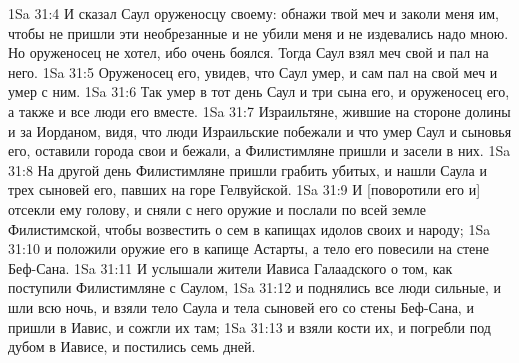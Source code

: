 \vs 1Sa 31:4 И сказал Саул оруженосцу своему: обнажи твой меч и заколи меня им, чтобы не пришли эти необрезанные и не убили меня и не издевались надо мною. Но оруженосец не хотел, ибо очень боялся. Тогда Саул взял меч свой и пал на него.
\vs 1Sa 31:5 Оруженосец его, увидев, что Саул умер, и сам пал на свой меч и умер с ним.
\vs 1Sa 31:6 Так умер в тот день Саул и три сына его, и оруженосец его, а также и все люди его вместе.
\vs 1Sa 31:7 Израильтяне, жившие на стороне долины и за Иорданом, видя, что люди Израильские побежали и что умер Саул и сыновья его, оставили города свои и бежали, а Филистимляне пришли и засели в них.
\vs 1Sa 31:8 На другой день Филистимляне пришли грабить убитых, и нашли Саула и трех сыновей его, павших на горе Гелвуйской.
\vs 1Sa 31:9 И [поворотили его и] отсекли ему голову, и сняли с него оружие и послали по всей земле Филистимской, чтобы возвестить о сем в капищах идолов своих и народу;
\vs 1Sa 31:10 и положили оружие его в капище Астарты, а тело его повесили на стене Беф-Сана.
\vs 1Sa 31:11 И услышали жители Иависа Галаадского о том, как поступили Филистимляне с Саулом,
\vs 1Sa 31:12 и поднялись все люди сильные, и шли всю ночь, и взяли тело Саула и тела сыновей его со стены Беф-Сана, и пришли в Иавис, и сожгли их там;
\vs 1Sa 31:13 и взяли кости их, и погребли под дубом в Иависе, и постились семь дней.
